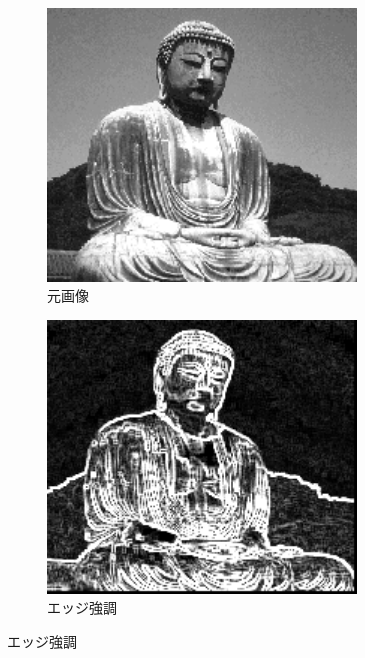 \documentclass[a4paper,12pt]{jsarticle}
\begin{document}
\begin{figure}[!htbp]
\centering
\begin{subfigure}[b]{0.45\textwidth}
    \centering
    \includegraphics[width=0.9\textwidth]{./sampleimages/sample2.png}
    \caption{元画像}
\end{subfigure}
\hfill
\begin{subfigure}[b]{0.45\textwidth}
    \centering
    \includegraphics[width=0.9\textwidth]{./images/edge_enhanced_sample2_edge.png}
    \caption{エッジ強調}
\end{subfigure}


\end{figure}
\end{document}
